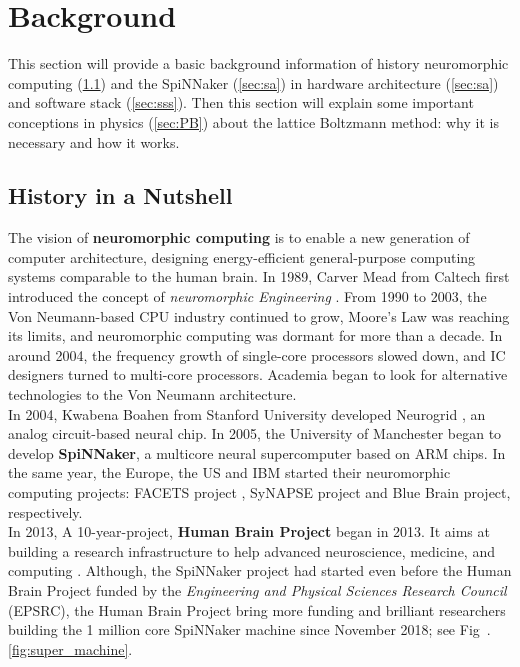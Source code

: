 \section{Background} \label{sec:bg}


This section will provide a basic background information of history neuromorphic computing (\ref{sec:sb}) and the SpiNNaker (\ref{sec:sa}) in hardware architecture (\ref{sec:sa}) and software stack (\ref{sec:sss}). Then this section will explain some important conceptions in physics (\ref{sec:PB}) about the lattice Boltzmann method: why it is necessary and how it works. 


\subsection{History in a Nutshell} \label{sec:sb}
The vision of \textbf{neuromorphic computing}\cite{mead1980introduction} is to enable a new generation of computer architecture, designing energy-efficient general-purpose computing systems comparable to the human brain. In 1989, Carver Mead from Caltech first introduced the concept of \textit{neuromorphic Engineering} \cite{mead1980introduction}. From 1990 to 2003, the Von Neumann-based CPU industry continued to grow, Moore's Law \cite{schaller1997moore} was reaching its limits, and neuromorphic computing was dormant for more than a decade. In around 2004, the frequency growth of single-core processors slowed down, and IC designers turned to multi-core processors. Academia began to look for alternative technologies to the Von Neumann architecture.\\

In 2004, Kwabena Boahen from Stanford University developed Neurogrid \cite{benjamin2014neurogrid}, an analog circuit-based neural chip. In 2005, the University of Manchester began to develop \textbf{SpiNNaker}, a multicore neural supercomputer based on ARM chips. In the same year, the Europe, the US and IBM started their neuromorphic computing projects: FACETS project \cite{meier2004fast}, SyNAPSE project\cite{park2014impact} and Blue Brain project\cite{gara2005overview}, respectively. \\

In 2013, A 10-year-project, \textbf{Human Brain Project} began in 2013. It aims at building a research infrastructure to help advanced neuroscience, medicine, and computing \cite{hbp}. Although, the SpiNNaker project had started even before the Human Brain Project funded by the \textit{Engineering and Physical Sciences Research Council} (EPSRC), the Human Brain Project bring more funding and brilliant researchers building the 1 million core SpiNNaker machine since November 2018; see Fig~.\ref{fig:super_machine}.

